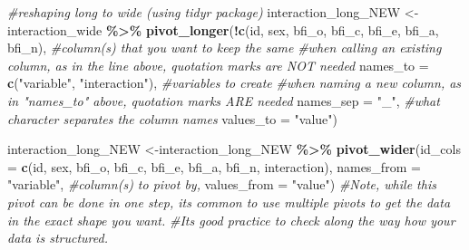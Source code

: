 \documentclass[
]{book}
\newenvironment{Shaded}{\begin{snugshade}}{\end{snugshade}}
\newcommand{\AttributeTok}[1]{\textcolor[rgb]{0.13,0.29,0.53}{#1}}
\newcommand{\CommentTok}[1]{\textcolor[rgb]{0.56,0.35,0.01}{\textit{#1}}}
\newcommand{\FunctionTok}[1]{\textcolor[rgb]{0.13,0.29,0.53}{\textbf{#1}}}
\newcommand{\NormalTok}[1]{#1}
\newcommand{\OtherTok}[1]{\textcolor[rgb]{0.56,0.35,0.01}{#1}}
\newcommand{\SpecialCharTok}[1]{\textcolor[rgb]{0.81,0.36,0.00}{\textbf{#1}}}
\newcommand{\StringTok}[1]{\textcolor[rgb]{0.31,0.60,0.02}{#1}}
\theoremstyle{definition}
\theoremstyle{definition}
\theoremstyle{definition}
\theoremstyle{definition}
\theoremstyle{remark}
\begin{document}
\begin{Shaded}
\begin{Highlighting}[]
\CommentTok{\#reshaping long to wide (using tidyr package)}
\NormalTok{interaction\_long\_NEW }\OtherTok{\textless{}{-}}\NormalTok{interaction\_wide }\SpecialCharTok{\%\textgreater{}\%}
  \FunctionTok{pivot\_longer}\NormalTok{(}\SpecialCharTok{!}\FunctionTok{c}\NormalTok{(id, sex, bfi\_o, bfi\_c, bfi\_e, bfi\_a, bfi\_n), }\CommentTok{\#column(s) that you want to keep the same}
               \CommentTok{\#when calling an existing column, as in the line above, quotation marks are NOT needed}
               \AttributeTok{names\_to =} \FunctionTok{c}\NormalTok{(}\StringTok{"variable"}\NormalTok{, }\StringTok{"interaction"}\NormalTok{), }\CommentTok{\#variables to create}
               \CommentTok{\#when naming a new column, as in "names\_to" above, quotation marks ARE needed}
               \AttributeTok{names\_sep =} \StringTok{"\_"}\NormalTok{, }\CommentTok{\#what character separates the column names}
               \AttributeTok{values\_to =} \StringTok{"value"}\NormalTok{)}

\NormalTok{interaction\_long\_NEW }\OtherTok{\textless{}{-}}\NormalTok{interaction\_long\_NEW }\SpecialCharTok{\%\textgreater{}\%}
  \FunctionTok{pivot\_wider}\NormalTok{(}\AttributeTok{id\_cols =} \FunctionTok{c}\NormalTok{(id, sex, bfi\_o, bfi\_c, bfi\_e, bfi\_a, bfi\_n, interaction),}
              \AttributeTok{names\_from =} \StringTok{"variable"}\NormalTok{, }\CommentTok{\#column(s) to pivot by,}
              \AttributeTok{values\_from =} \StringTok{"value"}\NormalTok{)}
\CommentTok{\#Note, while this pivot can be done in one step, it\textquotesingle{}s common to use multiple pivots to get the data in the exact shape you want. }
\CommentTok{\#It\textquotesingle{}s good practice to check along the way how your data is structured. }


\end{Highlighting}
\end{Shaded}
\end{document}
